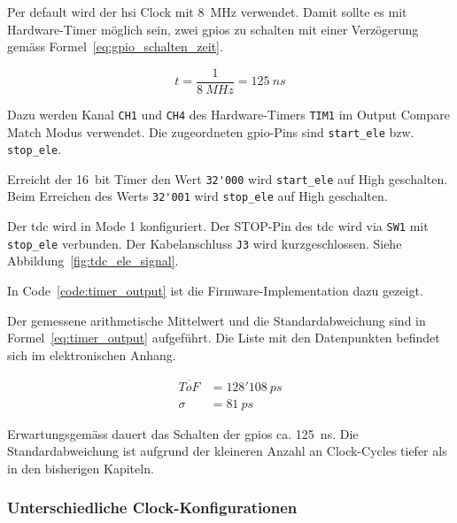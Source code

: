 Per default wird der \acrfull{hsi} Clock mit 8~MHz verwendet. Damit sollte es mit Hardware-Timer möglich sein, zwei
\acrshort{gpio}s zu schalten mit einer Verzögerung gemäss Formel~\ref{eq:gpio_schalten_zeit}.

\begin{equation}\label{eq:gpio_schalten_zeit}
    t = \frac{1}{8~MHz} = 125~ns
\end{equation}

Dazu werden Kanal \lstinline|CH1| und \lstinline|CH4| des Hardware-Timers \lstinline|TIM1| im Output Compare Match Modus
verwendet. Die zugeordneten \acrshort{gpio}-Pins sind \lstinline|start_ele| bzw. \lstinline|stop_ele|.

Erreicht der 16~bit Timer den Wert \lstinline|32'000| wird \lstinline|start_ele| auf High geschalten. Beim Erreichen des
Werts \lstinline|32'001| wird \lstinline|stop_ele| auf High geschalten.

Der \acrshort{tdc} wird in Mode 1 konfiguriert. Der STOP-Pin des \acrshort{tdc} wird via \lstinline|SW1| mit
\lstinline|stop_ele| verbunden. Der Kabelanschluss \lstinline|J3| wird kurzgeschlossen. Siehe
Abbildung~\ref{fig:tdc_ele_signal}.

In Code~\ref{code:timer_output} ist die Firmware-Implementation dazu gezeigt.



Der gemessene arithmetische Mittelwert und die Standardabweichung sind in Formel~\ref{eq:timer_output} aufgeführt.  Die
Liste mit den Datenpunkten befindet sich im elektronischen Anhang.

\begin{equation}\label{eq:timer_output}
    \begin{split}
        \overline{ToF} &=128'108~ps\\
        \sigma         &= 81~ps
    \end{split}
\end{equation}

Erwartungsgemäss dauert das Schalten der \acrshort{gpio}s ca. 125~ns. Die Standardabweichung ist aufgrund der kleineren
Anzahl an Clock-Cycles tiefer als in den bisherigen Kapiteln.

\subsubsection{Unterschiedliche Clock-Konfigurationen}

